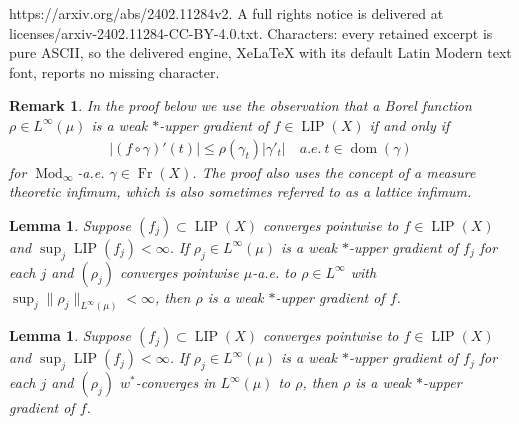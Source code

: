 \documentclass[10pt,a4paper]{amsart}
\newtheorem{lemma}[theorem]{Lemma}
\newtheorem{remark}[theorem]{Remark}
\newcommand{\Fr}{\operatorname{Fr}}
\newcommand{\LIP}{\operatorname{LIP}}
\newcommand{\Mod}{\operatorname{Mod}}
\begin{document}
https://arxiv.org/abs/2402.11284v2. A full rights notice is delivered at licenses/arxiv-2402.11284-CC-BY-4.0.txt. Characters: every retained excerpt is pure ASCII, so the delivered engine, XeLaTeX with its default Latin Modern text font, reports no missing character.
\begin{remark}\label{rmk:uppergradchar}
In the proof below we use the observation that a Borel function $\rho\in L^\infty(\mu)$ is a weak $\ast$-upper gradient of $f\in \LIP(X)$ if and only if 
\begin{align*}
|(f\circ\gamma)'(t)|\le \rho(\gamma_t)|\gamma'_t|\quad a.e.\ t\in \operatorname{dom}(\gamma)
\end{align*}
for $\Mod_\infty$-a.e. $\gamma\in \Fr(X)$. The proof also uses the concept of a measure theoretic infimum, which is also sometimes referred to as a lattice infimum.
\end{remark} 

\begin{lemma}\label{lem:lim-star-ug}
Suppose $(f_j)\subset \LIP(X)$ converges pointwise to $f\in \LIP(X)$ and $\sup_j\LIP(f_j)<\infty$. If $\rho_j\in L^\infty(\mu)$ is a weak $\ast$-upper gradient of $f_j$ for each $j$ and $(\rho_j)$ converges pointwise $\mu$-a.e. to $\rho\in L^\infty$ with $\sup_j\|\rho_j\|_{L^\infty(\mu)}<\infty$, then $\rho$ is a weak $\ast$-upper gradient of $f$.
\end{lemma}

\begin{lemma}\label{lem:lim-star-ug-weak}
Suppose $(f_j)\subset \LIP(X)$ converges pointwise to $f\in \LIP(X)$ and $\sup_j\LIP(f_j)<\infty$. If $\rho_j\in L^\infty(\mu)$ is a weak $\ast$-upper gradient of $f_j$ for each $j$ and $(\rho_j)$ $w^\ast$-converges in $L^\infty(\mu)$ to $\rho$, then $\rho$ is a weak $\ast$-upper gradient of $f$.
\end{lemma}
\end{document}
